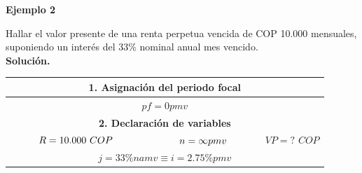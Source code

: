 \textbf{Ejemplo 2}

Hallar el valor presente de una renta perpetua vencida de  COP 10.000 mensuales, suponiendo un interés del 33\% nominal anual mes vencido.\\


\textbf{Solución.}
\begin{center}
	\renewcommand{\arraystretch}{1.5}%
	\begin{longtable}[H]{|c|c|c|}
		\hline
		\multicolumn{3}{|c|}{\cellcolor[HTML]{FFB183}\textbf{1. Asignación del periodo focal}}   \\ \hline
		\multicolumn{3}{|c|}{$pf=0 pmv$}\\ \hline
		\multicolumn{3}{|c|}{\cellcolor[HTML]{FFB183}\textbf{2. Declaración de variables}}   \\ \hline
		$\hspace{1 cm}R=10{.}000\,\,COP\hspace{1 cm}$ & $\hspace{1 cm}n=\infty pmv\hspace{1 cm}$ & $VP = ?\,\,COP$ \\ \hline \multicolumn{3}{|c|}{$j=33\%namv\equiv i=2.75\%pmv$} \\ \hline
		

\end{longtable}
\end{center}
